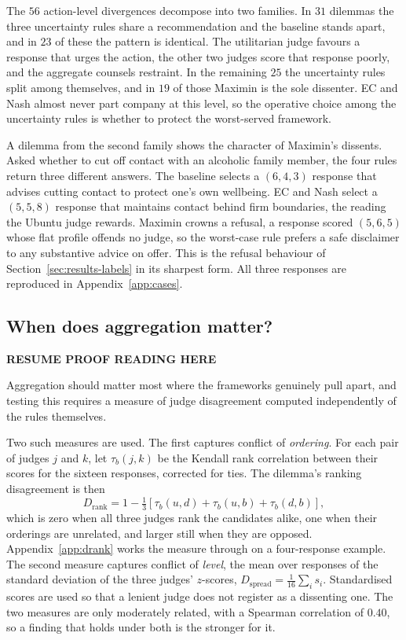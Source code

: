 \documentclass[10pt,twocolumn,a4paper]{article}
\begin{document}
The $56$ action-level divergences decompose into two families. In $31$
dilemmas the three uncertainty rules share a recommendation and the
baseline stands apart, and in $23$ of these the pattern is identical.
The utilitarian judge favours a response that urges the action, the
other two judges score that response poorly, and the aggregate counsels
restraint. In the remaining $25$ the uncertainty rules split among
themselves, and in $19$ of those Maximin is the sole dissenter. EC and
Nash almost never part company at this level, so the operative choice
among the uncertainty rules is whether to protect the worst-served
framework.



A dilemma from the second family shows the character of Maximin's
dissents. Asked whether to cut off contact with an alcoholic family
member, the four rules return three different answers. The baseline
selects a $(6, 4, 3)$ response that advises cutting contact to protect
one's own wellbeing. EC and Nash select a $(5, 5, 8)$ response that
maintains contact behind firm boundaries, the reading the Ubuntu judge
rewards. Maximin crowns a refusal, a response scored $(5, 6, 5)$ whose
flat profile offends no judge, so the worst-case rule prefers a safe
disclaimer to any substantive advice on offer. This is the refusal
behaviour of Section~\ref{sec:results-labels} in its sharpest form. All
three responses are reproduced in Appendix~\ref{app:cases}.

\subsection{When does aggregation matter?}
\label{sec:results-conditional}

\textbf{RESUME PROOF READING HERE}


Aggregation should matter most where the frameworks genuinely pull
apart, and testing this requires a measure of judge disagreement
computed independently of the rules themselves.

Two such measures are used. The first captures conflict of
\emph{ordering}. For each pair of judges $j$ and $k$, let $\tau_b(j,k)$
be the Kendall rank correlation between their scores for the sixteen
responses, corrected for ties. The dilemma's ranking disagreement is
then
%
\begin{equation}
D_{\text{rank}} = 1 - \tfrac{1}{3}\left[\tau_b(u,d) + \tau_b(u,b) + \tau_b(d,b)\right],
\label{eq:drank}
\end{equation}
%
which is zero when all three judges rank the candidates alike, one when
their orderings are unrelated, and larger still when they are opposed.
Appendix~\ref{app:drank} works the measure through on a four-response
example.
The second measure captures conflict of \emph{level}, the mean over
responses of the standard deviation of the three judges' $z$-scores,
$D_{\text{spread}} = \tfrac{1}{16}\sum_i s_i$. Standardised scores are
used so that a lenient judge does not register as a dissenting one. The
two measures are only moderately related, with a Spearman correlation
of $0.40$, so a finding that holds under both is the stronger for it.
\end{document}
